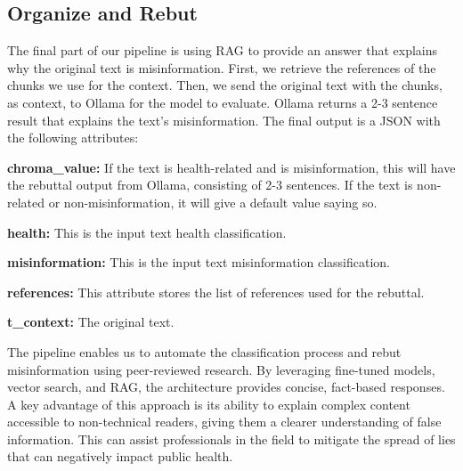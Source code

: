 \subsection{Organize and Rebut}
The final part of our pipeline is using RAG to provide an answer that explains why the original text is misinformation. First, we retrieve the references of the chunks we use for the context. Then, we send the original text with the chunks, as context, to Ollama for
the model to evaluate. Ollama returns a 2-3 sentence result that explains the text’s misinformation. The final output is a JSON with the following attributes:

\begin{description}
\item{\textbf{chroma\_value:}} If the text is health-related and is misinformation, this will have the rebuttal output from Ollama, consisting of 2-3 sentences. If the text is non-related or non-misinformation, it will give a default value saying so. 
\item{\textbf{health:}} This is the input text health classification.
\item{\textbf{misinformation:}} This is the input text misinformation classification.
\item{\textbf{references:}} This attribute stores the list of references used for the rebuttal. 
\item{\textbf{t\_context:}} The original text.

\end{description}

The pipeline enables us to automate the classification process and rebut misinformation using peer-reviewed research. By leveraging fine-tuned models, vector search, and RAG, the architecture provides concise, fact-based responses. A key advantage of this
approach is its ability to explain complex content accessible to non-technical readers, giving them a clearer understanding of false information. This can assist professionals in the field to mitigate the spread of lies that can negatively impact public health.




